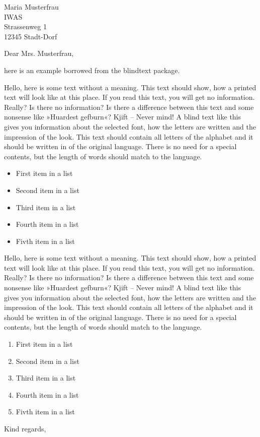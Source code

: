 \documentclass[english]{wiaslttr}
\begin{document}
\begin{letter}{Maria Musterfrau\\IWAS\\Strassenweg 1\\12345 Stadt-Dorf}
\subject{A long subject regarding the big great conference at our institute}
\opening{Dear Mrs. Musterfrau,}

here is an example borrowed from the blindtext package.

Hello, here is some text without a meaning. This text should show, how a
printed text will look like at this place. If you read this text, you will
get no information. Really? Is there no information? Is there a difference
between this text and some nonsense like »Huardest gefburn«? Kjift – Never
mind! A blind text like this gives you information about the selected font,
how the letters are written and the impression of the look. This text
should contain all letters of the alphabet and it should be written in of
the original language. There is no need for a special contents, but the
length of words should match to the language.

\begin{itemize}
  \item First item in a list
  \item Second item in a list
  \item Third item in a list
  \item Fourth item in a list
  \item Fivth item in a list
\end{itemize}

Hello, here is some text without a meaning. This text should show, how a
printed text will look like at this place. If you read this text, you will
get no information. Really? Is there no information? Is there a difference
between this text and some nonsense like »Huardest gefburn«? Kjift – Never
mind! A blind text like this gives you information about the selected font,
how the letters are written and the impression of the look. This text
should contain all letters of the alphabet and it should be written in of
the original language. There is no need for a special contents, but the
length of words should match to the language.

\begin{enumerate}
  \item First item in a list
  \item Second item in a list
  \item Third item in a list
  \item Fourth item in a list
  \item Fivth item in a list
\end{enumerate}

\closing{Kind regards,}
\end{letter}
\end{document}
